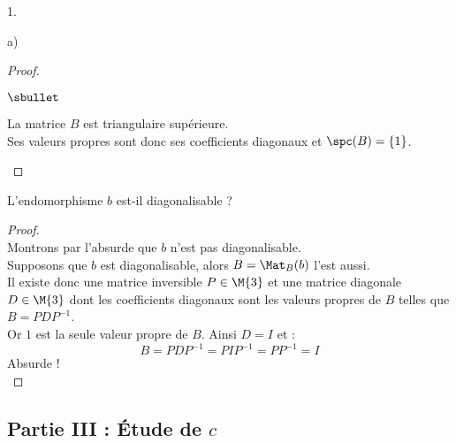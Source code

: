 \documentclass[11pt]{article}%
\begin{document}
\begin{noliste}{1.}
\begin{noliste}{a)}
\begin{proof}
\begin{noliste}{$\sbullet$}
      \item La matrice $B$ est triangulaire supérieure.\\
        Ses valeurs propres sont donc ses coefficients diagonaux et
        $\spc(B) = \{ 1 \}$.%
	~\\[-1cm]
      \end{noliste}
    \end{proof}
    
  \item L'endomorphisme $b$ est-il diagonalisable ?
    
    \begin{proof}~\\
      Montrons par l'absurde que $b$ n'est pas diagonalisable.\\
      Supposons que $b$ est diagonalisable, alors $B = \Mat_{B}(b)$
      l'est aussi.\\
      Il existe donc une matrice inversible $P \in \M{3}$ et une
      matrice diagonale $D \in \M{3}$ dont les coefficients diagonaux
      sont les valeurs propres de $B$ telles que $B = PDP^{-1}$.\\
      Or $1$ est la seule valeur propre de $B$. Ainsi $D = I$ et :
      \[
      B = PDP^{-1} = PIP^{-1} = PP^{-1} = I
      \]
      Absurde !%
      ~\\[-1.4cm]
    \end{proof}
  \end{noliste}
\end{noliste}

\subsection*{Partie III : Étude de $c$}
\end{document}
